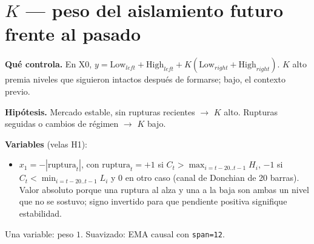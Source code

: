 \documentclass[11pt,a4paper]{article}
\newcommand{\code}[1]{\texttt{\small #1}}
\begin{document}
\section*{$K$ --- peso del aislamiento futuro frente al pasado}

\textbf{Qué controla.} En X0, $y=\text{Low}_{left}+\text{High}_{left}+K(\text{Low}_{right}+\text{High}_{right})$. $K$ alto premia niveles que siguieron intactos después de formarse; bajo, el contexto previo.

\textbf{Hipótesis.} Mercado estable, sin rupturas recientes $\rightarrow$ $K$ alto. Rupturas seguidas o cambios de régimen $\rightarrow$ $K$ bajo.

\textbf{Variables} (velas H1):
\begin{itemize}\setlength{\itemsep}{1pt}\setlength{\topsep}{1pt}
\item $x_1=-|\text{ruptura}_t|$, con $\text{ruptura}_t=+1$ si $C_t>\max_{i=t-20..t-1}H_i$, $-1$ si $C_t<\min_{i=t-20..t-1}L_i$ y $0$ en otro caso (canal de Donchian de 20 barras). Valor absoluto porque una ruptura al alza y una a la baja son ambas un nivel que no se sostuvo; signo invertido para que pendiente positiva signifique estabilidad.
\end{itemize}
Una variable: peso $1$. Suavizado: EMA causal con \code{span=12}.
\end{document}
